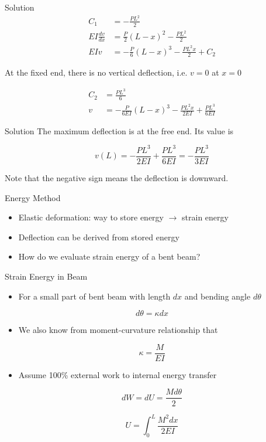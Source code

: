 \documentclass[10pt, svgnames]{beamer}
\begin{document}
\begin{frame}[label={sec:org9c44299}]{Solution}
\begin{align*}
  C_1 &=  - \frac{PL^2}{2} \\
  EI\frac{dv}{dx} &= \frac{P}{2}(L - x)^2 - \frac{PL^2}{2} \\
  EIv &=  - \frac{P}{6}{(L - x)^3} - \frac{PL^2x}{2} + C_2
\end{align*}

At the fixed end, there is no vertical deflection, i.e. \(v = 0\) at
\(x = 0\)

\begin{align*}
  C_2 &= \frac{PL^3}{6} \\
  v &=  - \frac{P}{6EI}(L - x)^3 - \frac{PL^2x}{2EI} + \frac{PL^3}{6EI}
\end{align*}
\end{frame}

\begin{frame}[label={sec:org43ff707}]{Solution}
The maximum deflection is at the free end. Its value is

\[v(L) =  - \frac{PL^3}{2EI} + \frac{PL^3}{6EI} =  - \frac{PL^3}{3EI}\]

Note that the negative sign means the deflection is downward.
\end{frame}

\begin{frame}[label={sec:org31eef7c}]{Energy Method}
\begin{itemize}
\item Elastic deformation: way to store energy \(\rightarrow\) strain energy

\item Deflection can be derived from stored energy

\item How do we evaluate strain energy of a bent beam?
\end{itemize}
\end{frame}

\begin{frame}[label={sec:orgdb34d25}]{Strain Energy in Beam}
\begin{itemize}
\item For a small part of bent beam with length \(dx\) and bending angle
\(d\theta\)
\end{itemize}

\[d\theta = \kappa dx\]

\begin{itemize}
\item We also know from moment-curvature relationship that
\end{itemize}

\[\kappa = \frac{M}{EI}\]

\begin{itemize}
\item Assume 100\% external work to internal energy transfer
\end{itemize}

\[dW = dU = \frac{Md\theta}{2}\]

\[U = \int_0^L \frac{M^2 dx}{2EI}\]
\end{frame}
\end{document}
